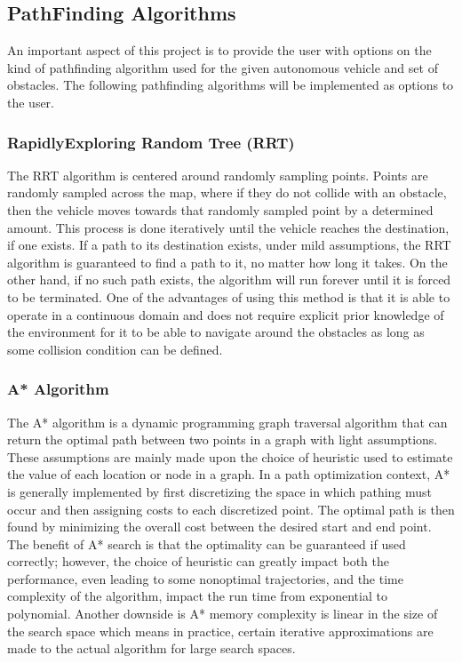 \documentclass[letterpaper,10pt,english]{sphinxmanual}
\begin{document}
\subsection{Path\sphinxhyphen{}Finding Algorithms}
\label{\detokenize{background_science:path-finding-algorithms}}
\sphinxAtStartPar
An important aspect of this project is to provide the user with options on the kind of path\sphinxhyphen{}finding algorithm used for the given autonomous vehicle and set of obstacles. The following path\sphinxhyphen{}finding algorithms will be implemented as options to the user.


\subsubsection{Rapidly\sphinxhyphen{}Exploring Random Tree (RRT)}
\label{\detokenize{background_science:rapidly-exploring-random-tree-rrt}}
\sphinxAtStartPar
The RRT algorithm is centered around randomly sampling points. Points are randomly sampled across the map, where if they do not collide with an obstacle, then the vehicle moves towards that randomly sampled point by a determined amount. This process is done iteratively until the vehicle reaches the destination, if one exists. If a path to its destination exists, under mild assumptions, the RRT algorithm is guaranteed to find a path to it, no matter how long it takes. On the other hand, if no such path exists, the algorithm will run forever until it is forced to be terminated. One of the advantages of using this method is that it is able to operate in a continuous domain and does not require explicit prior knowledge of the environment for it to be able to navigate around the obstacles as long as some collision condition can be defined.


\subsubsection{A* Algorithm}
\label{\detokenize{background_science:a-algorithm}}
\sphinxAtStartPar
The A* algorithm is a dynamic programming graph traversal algorithm that can return the optimal path between two points in a graph with light assumptions. These assumptions are mainly made upon the choice of heuristic used to estimate the value of each location or node in a graph. In a path optimization context, A* is generally implemented by first discretizing the space in which pathing must occur and then assigning costs to each discretized point. The optimal path is then found by minimizing the overall cost between the desired start and end point. The benefit of A* search is that the optimality can be guaranteed if used correctly; however, the choice of heuristic can greatly impact both the performance, even leading to some non\sphinxhyphen{}optimal trajectories, and the time complexity of the algorithm, impact the run time from exponential to polynomial. Another downside is A* memory complexity is linear in the size of the search space which means in practice, certain iterative approximations are made to the actual algorithm for large search spaces.
\end{document}
